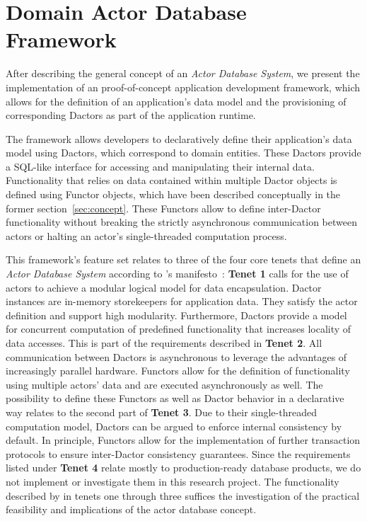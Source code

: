 
\section{Domain Actor Database Framework}\label{sec:framework}

After describing the general concept of an \textit{Actor Database System}, we present the implementation of an proof-of-concept application development framework, which allows for the definition of an application's data model and the provisioning of corresponding Dactors as part of the application runtime.

The framework allows developers to declaratively define their application's data model using Dactors, which correspond to domain entities.
These Dactors provide a SQL-like interface for accessing and manipulating their internal data.
Functionality that relies on data contained within multiple Dactor objects is defined using Functor objects, which have been described conceptually in the former section~\ref{sec:concept}.
These Functors allow to define inter-Dactor functionality without breaking the strictly asynchronous communication between actors or halting an actor's single-threaded computation process.

This framework's feature set relates to three of the four core tenets that define an \textit{Actor Database System} according to \citeauthor{manifesto}'s manifesto~\cite{manifesto}:
\textbf{Tenet 1} calls for the use of actors to achieve a modular logical model for data encapsulation.
Dactor instances are in-memory storekeepers for application data.
They satisfy the actor definition and support high modularity.
Furthermore, Dactors provide a model for concurrent computation of predefined functionality that increases locality of data accesses.
This is part of the requirements described in \textbf{Tenet 2}.
All communication between Dactors is asynchronous to leverage the advantages of increasingly parallel hardware.
Functors allow for the definition of functionality using multiple actors' data and are executed asynchronously as well.
The possibility to define these Functors as well as Dactor behavior in a declarative way relates to the second part of \textbf{Tenet 3}.
Due to their single-threaded computation model, Dactors can be argued to enforce internal consistency by default.
In principle, Functors allow for the implementation of further transaction protocols to ensure inter-Dactor consistency guarantees.
Since the requirements listed under \textbf{Tenet 4} relate mostly to production-ready database products, we do not implement or investigate them in this research project.
The functionality described by \citeauthor{manifesto} in tenets one through three suffices the investigation of the practical feasibility and implications of the actor database concept.

